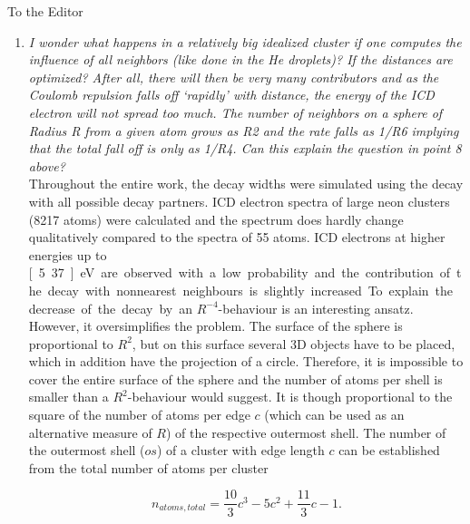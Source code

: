 \documentclass[DIN,pagenumber=false,parskip=half,fromalign=left,fromphone=true,fromemail=true,fromurl=false,fromlogo=false,fromrule=false]{scrlttr2}
\begin{document}
\begin{letter}{To the Editor}
\begin{enumerate}
{\color{blue}{
Cluster structures with larger interatomic distances of the surface atoms between 
each other and the core atoms would explain the higher experimental lifetimes of  
the surface atoms. These could be caused by non-ideal structures due to the       
clusters' temperature.}} ...

 \item \emph{I wonder what happens in a relatively big idealized cluster if one computes the influence of all neighbors (like done in the He droplets)? If the distances are optimized? After all, there will then be very many contributors and as the Coulomb repulsion falls off ‘rapidly’ with distance, the energy of the ICD electron will not spread too much. The number of neighbors on a sphere of Radius R from a given atom grows as R2 and the rate falls as 1/R6 implying that the total fall off is only as 1/R4. Can this explain the question in point 8 above?}\\
      Throughout the entire work, the decay widths were simulated using the decay
      with all possible decay partners.
      ICD electron spectra of large neon clusters (8217 atoms) were
      calculated and the spectrum does
      hardly change qualitatively compared to the spectra of 55 atoms. ICD electrons
      at higher energies up to \unit[5.37]{eV} are observed with a low probability and the
      contribution of the decay with nonnearest neighbours is slightly increased.
      
      To explain the decrease of the decay by an $R^{-4}$-behaviour is an interesting
      ansatz. However, it oversimplifies the problem.
      The surface of the sphere is proportional to $R^2$, but on this surface several
      3D objects have to be placed, which in addition have the projection of a circle.
      Therefore, it is impossible to cover the entire surface of the sphere and
      the number of atoms per shell is smaller than a $R^2$-behaviour would suggest.
      It is though
      proportional to the square of the number of atoms per edge $c$
      (which can be used as an alternative measure of $R$) of the respective
      outermost shell. The number of the outermost
      shell ($os$) of a cluster with edge length $c$ can be established from 
      the total number of atoms per cluster

      \begin{equation*}
       n_{atoms,total} = \frac{10}{3} c^3 - 5 c^2 + \frac{11}{3} c -1 .
      \end{equation*}


\end{enumerate}
\end{letter}
\end{document}
